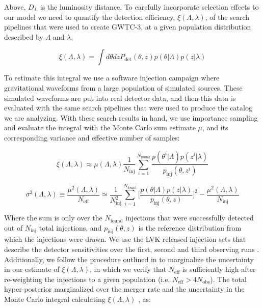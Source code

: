 \noindent Above, $D_L$ is the luminosity distance. To carefully incorporate selection effects to our model we need to quantify the detection efficiency,
$\xi(\Lambda, \lambda)$, of the search pipelines that were used to create GWTC-3, at a given population distribution described by $\Lambda$ and $\lambda$.
 
\begin{equation}
     \xi(\Lambda, \lambda) = \int d\theta dz P_\mathrm{det}(\theta, z)p(\theta | \Lambda) p(z | \lambda)
\end{equation}
 
\noindent
To estimate this integral we use a software injection campaign where gravitational waveforms from a large population of simulated sources. 
These simulated waveforms are put into real detector data, and then this data is evaluated with the same search pipelines that were used to 
produce the catalog we are analyzing. With these search results in hand, we use importance sampling and evaluate the integral 
with the Monte Carlo sum estimate $\mu$, and its corresponding variance and effective number of samples:

\begin{equation} \label{xi}
     \xi(\Lambda, \lambda) \approx \mu(\Lambda, \lambda) \frac{1}{N_\mathrm{inj}} \sum_{i=1}^{N_\mathrm{found}} \frac{p(\theta^i | \Lambda) p(z^i | \lambda)}{p_\mathrm{inj}(\theta, z^i)}
\end{equation}

\begin{equation}
    \sigma^2(\Lambda, \lambda) \equiv \frac{\mu^2(\Lambda, \lambda)}{N_\mathrm{eff}} \simeq \frac{1}{N^2_\mathrm{inj}} \sum_{i=1}^{N_\mathrm{found}} \bigg[\frac{p(\theta | \Lambda) p(z | \lambda)}{p_\mathrm{inj}(\theta, z)}\bigg]^2 - \frac{\mu^2(\Lambda, \lambda)}{N_\mathrm{inj}}
\end{equation}

\noindent
Where the sum is only over the $N_\mathrm{found}$ injections that were successfully detected out of $N_\mathrm{inj}$ total injections, 
and $p_\mathrm{inj}(\theta, z)$ is the reference distribution from which the injections were drawn. We use the LVK released injection sets that describe the 
detector sensitivities over the first, second and third observing runs \citep{o1o2o3_injection_sets}. Additionally, we follow the procedure 
outlined in \citet{Farr_2019} to marginalize the uncertainty in our estimate of $\xi(\Lambda, \lambda)$, in which we verify that $N_\mathrm{eff}$ is 
sufficiently high after re-weighting the injections to a given population (i.e. $N_\mathrm{eff} > 4N_\mathrm{obs}$). 
The total hyper-posterior marginalized over the merger rate and the uncertainty in the Monte Carlo integral calculating $\xi(\Lambda, \lambda)$ \citep{Farr_2019}, as:

